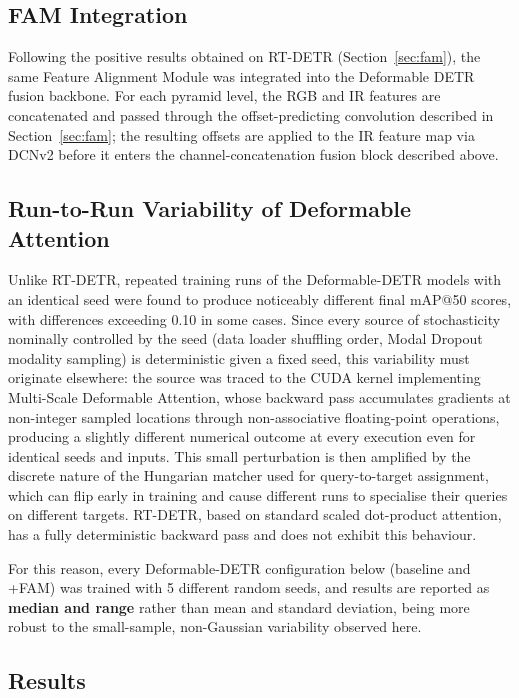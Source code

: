 \documentclass[12pt, a4paper]{article}
\begin{document}
\subsection{FAM Integration}

Following the positive results obtained on RT-DETR (Section~\ref{sec:fam}), the same Feature Alignment Module was integrated into the Deformable DETR fusion backbone. For each pyramid level, the RGB and IR features are concatenated and passed through the offset-predicting convolution described in Section~\ref{sec:fam}; the resulting offsets are applied to the IR feature map via DCNv2 before it enters the channel-concatenation fusion block described above.

\subsection{Run-to-Run Variability of Deformable Attention}
\label{subsec:def_detr_variance}

Unlike RT-DETR, repeated training runs of the Deformable-DETR models with an identical seed were found to produce noticeably different final mAP@50 scores, with differences exceeding 0.10 in some cases. Since every source of stochasticity nominally controlled by the seed (data loader shuffling order, Modal Dropout modality sampling) is deterministic given a fixed seed, this variability must originate elsewhere: the source was traced to the CUDA kernel implementing Multi-Scale Deformable Attention, whose backward pass accumulates gradients at non-integer sampled locations through non-associative floating-point operations, producing a slightly different numerical outcome at every execution even for identical seeds and inputs. This small perturbation is then amplified by the discrete nature of the Hungarian matcher used for query-to-target assignment, which can flip early in training and cause different runs to specialise their queries on different targets. RT-DETR, based on standard scaled dot-product attention, has a fully deterministic backward pass and does not exhibit this behaviour.

For this reason, every Deformable-DETR configuration below (baseline and +FAM) was trained with 5 different random seeds, and results are reported as \textbf{median and range} rather than mean and standard deviation, being more robust to the small-sample, non-Gaussian variability observed here.

\subsection{Results}
\end{document}
